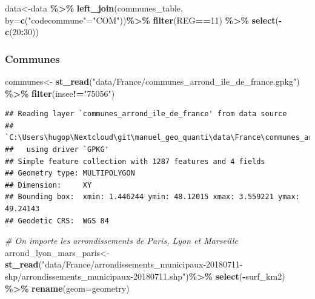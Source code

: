 \documentclass[
]{book}
\newenvironment{Shaded}{\begin{snugshade}}{\end{snugshade}}
\newcommand{\AttributeTok}[1]{\textcolor[rgb]{0.13,0.29,0.53}{#1}}
\newcommand{\CommentTok}[1]{\textcolor[rgb]{0.56,0.35,0.01}{\textit{#1}}}
\newcommand{\DecValTok}[1]{\textcolor[rgb]{0.00,0.00,0.81}{#1}}
\newcommand{\FunctionTok}[1]{\textcolor[rgb]{0.13,0.29,0.53}{\textbf{#1}}}
\newcommand{\NormalTok}[1]{#1}
\newcommand{\OtherTok}[1]{\textcolor[rgb]{0.56,0.35,0.01}{#1}}
\newcommand{\SpecialCharTok}[1]{\textcolor[rgb]{0.81,0.36,0.00}{\textbf{#1}}}
\newcommand{\StringTok}[1]{\textcolor[rgb]{0.31,0.60,0.02}{#1}}
\begin{document}
\begin{Shaded}
\begin{Highlighting}[]
\NormalTok{data}\OtherTok{\textless{}{-}}\NormalTok{data }\SpecialCharTok{\%\textgreater{}\%}
  \FunctionTok{left\_join}\NormalTok{(communes\_table, }\AttributeTok{by=}\FunctionTok{c}\NormalTok{(}\StringTok{"codecommune"}\OtherTok{=}\StringTok{"COM"}\NormalTok{))}\SpecialCharTok{\%\textgreater{}\%}
  \FunctionTok{filter}\NormalTok{(REG}\SpecialCharTok{==}\DecValTok{11}\NormalTok{) }\SpecialCharTok{\%\textgreater{}\%}
  \FunctionTok{select}\NormalTok{(}\SpecialCharTok{{-}}\FunctionTok{c}\NormalTok{(}\DecValTok{20}\SpecialCharTok{:}\DecValTok{30}\NormalTok{))}
\end{Highlighting}
\end{Shaded}

\hypertarget{communes}{%
\subsubsection{Communes}\label{communes}}

\begin{Shaded}
\begin{Highlighting}[]
\NormalTok{communes}\OtherTok{\textless{}{-}} \FunctionTok{st\_read}\NormalTok{(}\StringTok{"data/France/communes\_arrond\_ile\_de\_france.gpkg"}\NormalTok{) }\SpecialCharTok{\%\textgreater{}\%}
  \FunctionTok{filter}\NormalTok{(insee}\SpecialCharTok{!=}\StringTok{"75056"}\NormalTok{)}
\end{Highlighting}
\end{Shaded}

\begin{verbatim}
## Reading layer `communes_arrond_ile_de_france' from data source 
##   `C:\Users\hugop\Nextcloud\git\manuel_geo_quanti\data\France\communes_arrond_ile_de_france.gpkg' 
##   using driver `GPKG'
## Simple feature collection with 1287 features and 4 fields
## Geometry type: MULTIPOLYGON
## Dimension:     XY
## Bounding box:  xmin: 1.446244 ymin: 48.12015 xmax: 3.559221 ymax: 49.24143
## Geodetic CRS:  WGS 84
\end{verbatim}

\begin{Shaded}
\begin{Highlighting}[]
\CommentTok{\# On importe les arrondissements de Paris, Lyon et Marseille}
\NormalTok{arrond\_lyon\_mars\_paris}\OtherTok{\textless{}{-}} \FunctionTok{st\_read}\NormalTok{(}\StringTok{"data/France/arrondissements\_municipaux{-}20180711{-}shp/arrondissements\_municipaux{-}20180711.shp"}\NormalTok{)}\SpecialCharTok{\%\textgreater{}\%}
  \FunctionTok{select}\NormalTok{(}\SpecialCharTok{{-}}\NormalTok{surf\_km2) }\SpecialCharTok{\%\textgreater{}\%} 
  \FunctionTok{rename}\NormalTok{(}\AttributeTok{geom=}\NormalTok{geometry)}
\end{Highlighting}
\end{Shaded}
\end{document}
